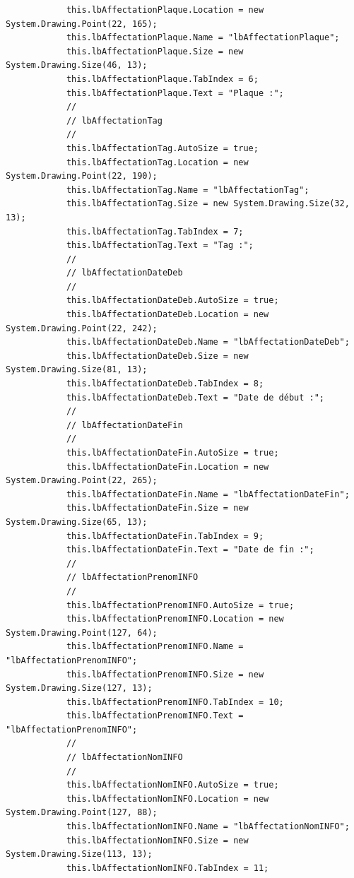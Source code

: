 \documentclass[main.tex]{subfiles}
\begin{document}
\begin{lstlisting}
            this.lbAffectationPlaque.Location = new System.Drawing.Point(22, 165);
            this.lbAffectationPlaque.Name = "lbAffectationPlaque";
            this.lbAffectationPlaque.Size = new System.Drawing.Size(46, 13);
            this.lbAffectationPlaque.TabIndex = 6;
            this.lbAffectationPlaque.Text = "Plaque :";
            // 
            // lbAffectationTag
            // 
            this.lbAffectationTag.AutoSize = true;
            this.lbAffectationTag.Location = new System.Drawing.Point(22, 190);
            this.lbAffectationTag.Name = "lbAffectationTag";
            this.lbAffectationTag.Size = new System.Drawing.Size(32, 13);
            this.lbAffectationTag.TabIndex = 7;
            this.lbAffectationTag.Text = "Tag :";
            // 
            // lbAffectationDateDeb
            // 
            this.lbAffectationDateDeb.AutoSize = true;
            this.lbAffectationDateDeb.Location = new System.Drawing.Point(22, 242);
            this.lbAffectationDateDeb.Name = "lbAffectationDateDeb";
            this.lbAffectationDateDeb.Size = new System.Drawing.Size(81, 13);
            this.lbAffectationDateDeb.TabIndex = 8;
            this.lbAffectationDateDeb.Text = "Date de début :";
            // 
            // lbAffectationDateFin
            // 
            this.lbAffectationDateFin.AutoSize = true;
            this.lbAffectationDateFin.Location = new System.Drawing.Point(22, 265);
            this.lbAffectationDateFin.Name = "lbAffectationDateFin";
            this.lbAffectationDateFin.Size = new System.Drawing.Size(65, 13);
            this.lbAffectationDateFin.TabIndex = 9;
            this.lbAffectationDateFin.Text = "Date de fin :";
            // 
            // lbAffectationPrenomINFO
            // 
            this.lbAffectationPrenomINFO.AutoSize = true;
            this.lbAffectationPrenomINFO.Location = new System.Drawing.Point(127, 64);
            this.lbAffectationPrenomINFO.Name = "lbAffectationPrenomINFO";
            this.lbAffectationPrenomINFO.Size = new System.Drawing.Size(127, 13);
            this.lbAffectationPrenomINFO.TabIndex = 10;
            this.lbAffectationPrenomINFO.Text = "lbAffectationPrenomINFO";
            // 
            // lbAffectationNomINFO
            // 
            this.lbAffectationNomINFO.AutoSize = true;
            this.lbAffectationNomINFO.Location = new System.Drawing.Point(127, 88);
            this.lbAffectationNomINFO.Name = "lbAffectationNomINFO";
            this.lbAffectationNomINFO.Size = new System.Drawing.Size(113, 13);
            this.lbAffectationNomINFO.TabIndex = 11;

\end{lstlisting}
\end{document}
